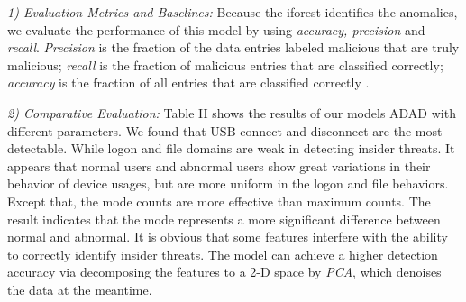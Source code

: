 \documentclass[conference]{IEEEtran}
\begin{document}
\emph{1) Evaluation Metrics and Baselines:}
Because the iforest identifies the anomalies, we evaluate the performance of this model by using \emph{accuracy, precision} and \emph{recall}.  
\emph{Precision} is the
fraction of the data entries labeled malicious that are
truly malicious; \emph{recall} is the fraction of malicious entries that are
classified correctly; \emph{accuracy} is the fraction of all entries
that are classified correctly \cite{b22}.

\emph{2) Comparative Evaluation:} Table II shows the results of our models ADAD with different parameters.
We found that USB connect and disconnect are the most detectable. While logon and file domains are weak in detecting insider threats. It appears that normal users and abnormal users show great variations in their behavior of device usages, but are more uniform in the logon and file behaviors. Except that, the mode counts are more effective than maximum counts. The result indicates that the mode represents a more significant difference between normal and abnormal. It is obvious that some features interfere with the ability to correctly identify insider threats. 
The model can achieve a higher detection accuracy via decomposing the features to a 2-D space by \emph{PCA}, which denoises the data at the meantime.
\end{document}
